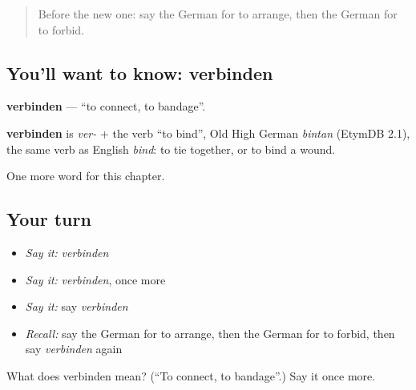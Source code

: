 \label{lesson:GE-C189-verbinden}



\begin{quote}
Before the new one: say the German for to arrange, then the German for to forbid.
\end{quote}

\subsection*{You'll want to know: verbinden}
\textbf{verbinden} — \textquotedblleft{}to connect, to bandage\textquotedblright{}.

\begin{cousinweb}
\textbf{verbinden} is \emph{ver-} + the verb \textquotedblleft{}to bind\textquotedblright{}, Old High German \emph{bintan} (EtymDB 2.1), the same verb as English \emph{bind}: to tie together, or to bind a wound.
\end{cousinweb}

\begin{grammarlens}[title={What you've built}]
One more word for this chapter.
\end{grammarlens}

\subsection*{Your turn}
\begin{itemize}
\raggedright
  \item \emph{Say it:} \emph{verbinden}
  \item \emph{Say it:} \emph{verbinden}, once more
  \item \emph{Say it:} say \emph{verbinden}
  \item \emph{Recall:} say the German for to arrange, then the German for to forbid, then say \emph{verbinden} again
\end{itemize}

\begin{tcolorbox}[breakable,colback=teal!4,colframe=teal!35!black,title={Before you move on}]
What does verbinden mean? (\textquotedblleft{}To connect, to bandage\textquotedblright{}.) Say it once more.
\end{tcolorbox}
